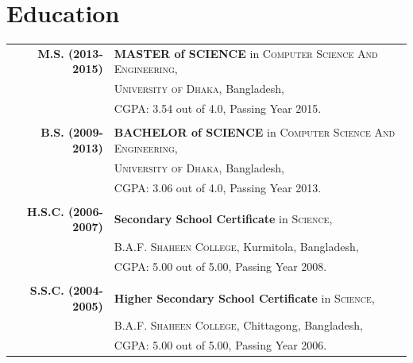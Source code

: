 \documentclass[a4paper,10pt]{article}
\newcommand{\du}{University of Dhaka}
\newcommand{\shaheen}{B.A.F. Shaheen College}
\newcommand{\bd}{Bangladesh}
\newcommand{\subcse}{Computer Science And Engineering}
\begin{document}
\bigskip
\bigskip
\section*{Education}
\begin{tabular}{r|l}
\\
\textbf{M.S. (2013-2015)}		&\textbf{MASTER of SCIENCE} in \textsc{\subcse},\\
							&\textsc{\du}, \bd,\\
							&CGPA: 3.54 out of 4.0, Passing Year 2015.\\\\
							
\textbf{B.S. (2009-2013)}		&\textbf{BACHELOR of SCIENCE} in \textsc{\subcse}, \\
							&\textsc{\du}, \bd,\\
							&CGPA: 3.06 out of 4.0, Passing Year 2013.\\\\

\textbf{H.S.C. (2006-2007)}		&\textbf{Secondary School Certificate} in \textsc{Science}, \\
							&\textsc{\shaheen}, Kurmitola, \bd,\\
							&CGPA: 5.00 out of 5.00, Passing Year 2008.\\\\
							
\textbf{S.S.C. (2004-2005)}		&\textbf{Higher Secondary School Certificate} in \textsc{Science}, \\
							&\textsc{\shaheen}, Chittagong, \bd,\\
							&CGPA: 5.00 out of 5.00, Passing Year 2006.\\

\end{tabular}
\end{document}
